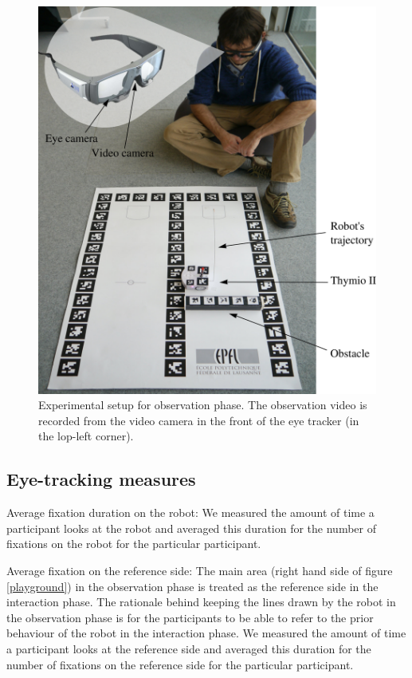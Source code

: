 \documentclass{sig-alternate}
\begin{document}
\begin{figure}
    \centering
    \includegraphics[width=0.9\linewidth]{setup}
    \caption{\small Experimental setup for observation phase. The observation
    video is recorded from the video camera in the front of the eye tracker (in
    the lop-left corner).}

    \label{expe}
\end{figure}


\subsection{Eye-tracking measures}

Average fixation duration on the robot: We measured the amount of time a
participant looks at the robot and averaged this duration for the number
of fixations on the robot for the particular participant.

Average fixation on the reference side: The main area (right hand side
of figure \ref{playground}) in the observation phase is treated as the reference side
in the interaction phase. The rationale behind keeping the lines drawn
by the robot in the observation phase is for the participants to be able
to refer to the prior behaviour of the robot in the interaction phase. We
measured the amount of time a participant looks at the reference side
and averaged this duration for the number of fixations on the reference
side for the particular participant.
\end{document}
